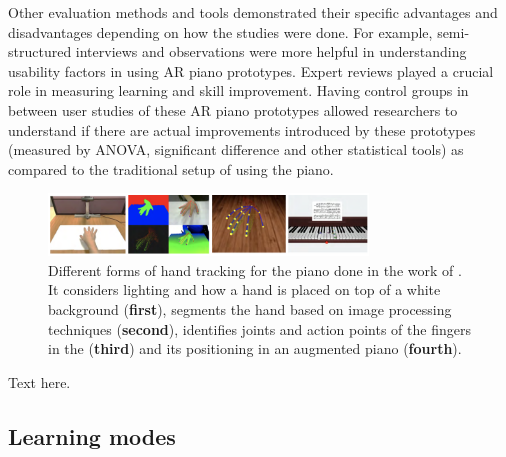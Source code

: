 \documentclass[sigchi, review]{acmart}
\begin{document}
Other evaluation methods and tools demonstrated their specific advantages and disadvantages depending on how the studies were done. For example, semi-structured interviews and observations were more helpful in understanding usability factors in using AR piano prototypes. Expert reviews played a crucial role in measuring learning and skill improvement. Having control groups in between user studies of these AR piano prototypes allowed researchers to understand if there are actual improvements introduced by these prototypes (measured by ANOVA, significant difference and other statistical tools) as compared to the traditional setup of using the piano. 



\begin{figure}[t]
    \centering
    \includegraphics[width=8.5cm]{figures/lianghandtrack.png}
    \caption{Different forms of hand tracking for the piano done in the work of \cite{liang2016barehanded}. It considers lighting and how a hand is placed on top of a white background (\textbf{first}), segments the hand based on image processing techniques (\textbf{second}), identifies joints and action points of the fingers in the (\textbf{third}) and its positioning in an augmented piano (\textbf{fourth}). }
    \label{fig:lianghandtrack}
\end{figure}

Text here. 

\subsection{Learning modes}
\label{subsec: learn}
\end{document}
